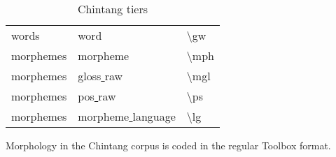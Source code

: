 \documentclass[a4paper, 11pt]{book}
\newcommand{\bks}{\textbackslash}	%
\newcommand{\und}{\underline{{ }}\hspace{0.2mm}}	%
\begin{document}
\begin{table}[ht!]
\begin{tabular}{lll}
			words	 	& word			& \bks gw \\
			morphemes	& morpheme				& \bks mph \\ %
			morphemes	& gloss\und raw			& \bks mgl \\ %
			morphemes	& pos\und raw			& \bks ps \\ %
			morphemes	& morpheme\und language	& \bks lg \\
		\bottomrule
	\end{tabular}
	\caption{Chintang tiers}
	\label{tab:Chintang tiers}
\end{table}

%

Morphology in the Chintang corpus is coded in the regular Toolbox format. 
\end{document}
